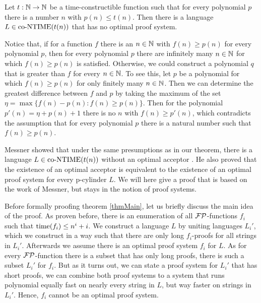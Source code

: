   \begin{theorem}\label{thmMain}
    Let \(t : \mathbb{N} \to \mathbb{N}\) be a time-constructible function such that for every polynomial \(p\) there is a number \(n\) with \(p(n) \leq t(n)\). Then there is a language \(L \in \text{co-NTIME}(t(n))\) that has no optimal proof system.
  \end{theorem}

  Notice that, if for a function \(f\) there is an \(n \in \mathbb{N}\) with \(f(n) \geq p(n)\) for every polynomial \(p\), then for every polynomial \(p\) there are infinitely many \(n \in \mathbb{N}\) for which \(f(n) \geq p(n)\) is satisfied. Otherwise, we could construct a polynomial \(q\) that is greater than \(f\) for every \(n \in \mathbb{N}\). To see this, let \(p\) be a polynomial for which \(f(n) \geq p(n)\) for only finitely many \(n \in \mathbb{N}\). Then we can determine the greatest difference between \(f\) and \(p\) by taking the maximum of the set \(\eta = \max \{ f(n) - p(n) : f(n) \geq p(n) \}\). Then for the polynomial \(p'(n) = \eta + p(n) + 1\) there is no \(n\) with \(f(n) \geq p'(n)\), which contradicts the assumption that for every polynomial \(p\) there is a natural number such that \(f(n) \geq p(n)\).

  Messner showed that under the same presumptions as in our theorem, there is a language \(L \in \text{co-NTIME}(t(n))\) without an optimal acceptor \cite{Mes99}. He also proved that the existence of an optimal acceptor is equivalent to the existence of an optimal proof system for every p-cylinder \(L\). We will here give a proof that is based on the work of Messner, but stays in the notion of proof systems.

  Before formally proofing theorem \ref{thmMain}, let us briefly discuss the main idea of the proof. As proven before, there is an enumeration of all \(\mathcal{FP}\)-functions \(f_i\) such that \(\operatorname{time}(f_i) \leq n^i + i\). We construct a language \(L\) by uniting languages \(L_i'\), which we construct in a way such that there are only long \(f_i\)-proofs for all strings in \(L_i'\). Afterwards we assume there is an optimal proof system \(f_i\) for \(L\). As for every \(\mathcal{FP}\)-function there is a subset that has only long proofs, there is such a subset \(L_i'\) for \(f_i\). But as it turns out, we can state a proof system for \(L_i'\) that has short proofs, we can combine both proof systems to a system that runs polynomial equally fast on nearly every string in \(L\), but way faster on strings in \(L_i'\). Hence, \(f_i\) cannot be an optimal proof system.
  
